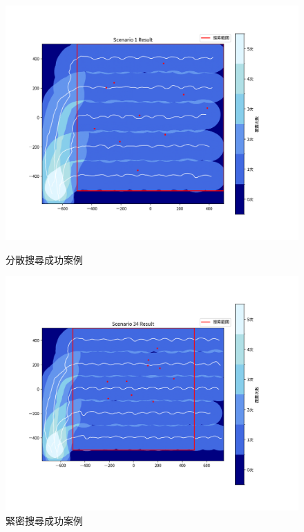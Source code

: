 \documentclass[12pt,a4paper]{article}
\begin{document}
\begin{figure}[h]
    \centering
    \begin{minipage}[t]{0.5\textwidth}
        \centering
        \includegraphics[width=\textwidth]{image/MultiLooseSuccess.png}
        \caption{分散搜尋成功案例}
    \end{minipage}%
    \hfill
    \begin{minipage}[t]{0.5\textwidth}
        \centering
        \includegraphics[width=\textwidth]{image/MultiTightSuccess.png}
        \caption{緊密搜尋成功案例}
    \end{minipage}%
\end{figure}
\end{document}
